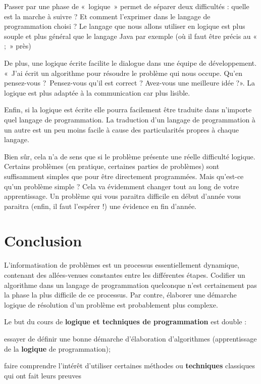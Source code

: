 	\begin{liste}
	\item
		Passer par une phase de «~logique~» permet de séparer deux difficultés :
		quelle est la marche à suivre ? Et comment l'exprimer
		dans le langage de programmation choisi ? Le langage que nous allons
		utiliser en logique est plus souple et plus général que le langage Java
		par exemple (où il faut être précis au « ;~» près)
	\item
		De plus, une logique écrite facilite le dialogue dans une équipe de
		développement. «~J'ai écrit un algorithme pour
		résoudre le problème qui nous occupe. Qu'en
		pensez-vous ?~Pensez-vous qu'il est correct ?
		Avez-vous une meilleure idée ?». La logique est plus adaptée à la
		communication car plus lisible.
	\item
		Enfin, si la logique est écrite elle pourra facilement être traduite
		dans n'importe quel langage de programmation. La
		traduction d'un langage de programmation à un autre
		est un peu moins facile à cause des particularités propres à chaque
		langage.
	\end{liste}

	Bien sûr, cela n'a de sens que si le problème présente
	une réelle difficulté logique. Certains problèmes (en pratique,
	certaines parties de problèmes) sont suffisamment simples que pour être
	directement programmées. Mais qu'est-ce
	qu'un problème simple ? Cela va évidemment changer
	tout au long de votre apprentissage. Un problème qui vous paraitra
	difficile en début d'année vous paraitra (enfin, il
	faut l'espérer !) une évidence en fin
	d'année.

\section{Conclusion}

	L’informatisation de problèmes est un processus essentiellement
	dynamique, contenant des allées-venues constantes entre les différentes
	étapes. Codifier un algorithme dans un langage de programmation
	quelconque n’est certainement pas la phase la plus difficile de ce
	processus. Par contre, élaborer une démarche logique de résolution d’un
	problème est probablement plus complexe.
	
	Le but du cours de \textbf{logique et techniques de programmation} est
	double :

	\begin{liste}
	\item
		essayer de définir une bonne démarche d’élaboration d’algorithmes
		(apprentissage de la \textbf{logique} de programmation);
	\item
		faire comprendre l’intérêt d’utiliser certaines méthodes ou
		\textbf{techniques} classiques qui ont fait leurs preuves
	\end{liste}

